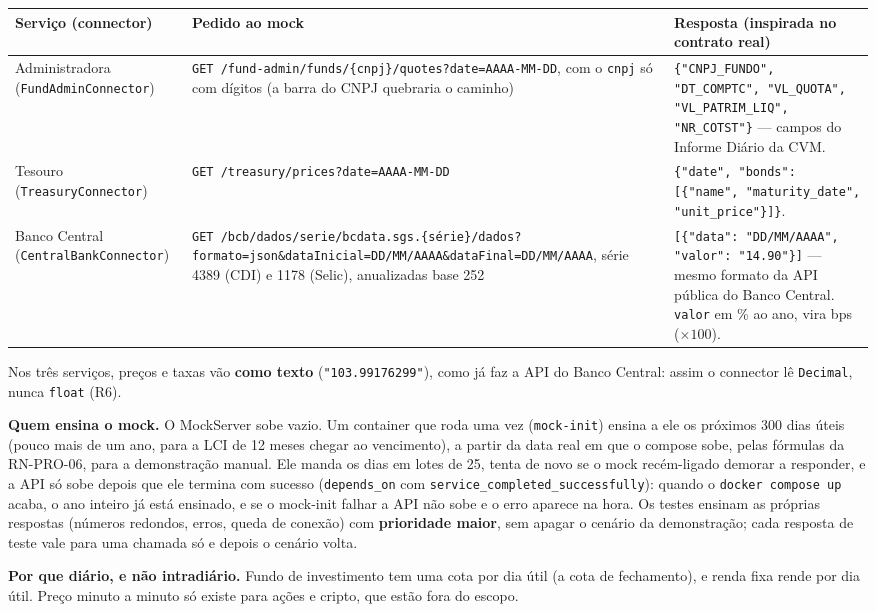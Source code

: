 \documentclass[11pt,a4paper]{article}
\newcommand{\tb}[1]{\texttt{#1}}           %
\begin{document}
\begingroup\small
\begin{longtable}{@{}P{2.7cm}P{6.3cm}P{7.0cm}@{}}
\toprule
\textbf{Serviço (connector)} & \textbf{Pedido ao mock} & \textbf{Resposta (inspirada no contrato real)} \\
\midrule
\endhead
Administradora (\tb{FundAdminConnector}) & \tb{GET /fund-admin/funds/\{cnpj\}/quotes?date=AAAA-MM-DD}, com o \tb{cnpj} só com dígitos (a barra do CNPJ quebraria o caminho) & \tb{\{"CNPJ_FUNDO", "DT_COMPTC", "VL_QUOTA", "VL_PATRIM_LIQ", "NR_COTST"\}} --- campos do Informe Diário da CVM. \\
Tesouro (\tb{TreasuryConnector}) & \tb{GET /treasury/prices?date=AAAA-MM-DD} & \tb{\{"date", "bonds": [\{"name", "maturity_date", "unit_price"\}]\}}. \\
Banco Central (\tb{CentralBankConnector}) & \tb{GET /bcb/dados/serie/bcdata.sgs.\{série\}/dados?formato=json\&dataInicial=DD/MM/AAAA\&dataFinal=DD/MM/AAAA}, série 4389 (CDI) e 1178 (Selic), anualizadas base 252 & \tb{[\{"data": "DD/MM/AAAA", "valor": "14.90"\}]} --- mesmo formato da API pública do Banco Central. \tb{valor} em \% ao ano, vira bps ($\times 100$). \\
\bottomrule
\end{longtable}
\endgroup

Nos três serviços, preços e taxas vão \textbf{como texto} (\tb{"103.99176299"}), como já faz a
API do Banco Central: assim o connector lê \tb{Decimal}, nunca \tb{float} (R6).

\textbf{Quem ensina o mock.} O MockServer sobe vazio. Um container que roda uma vez
(\tb{mock-init}) ensina a ele os próximos 300 dias úteis (pouco mais de um ano, para a LCI de 12
meses chegar ao vencimento), a partir da data real em que o compose sobe, pelas fórmulas da
RN-PRO-06, para a demonstração manual. Ele manda os dias em lotes de 25, tenta de novo se o mock
recém-ligado demorar a responder, e a API só sobe depois que ele termina com sucesso
(\tb{depends_on} com \tb{service_completed_successfully}): quando o \tb{docker compose up} acaba, o
ano inteiro já está ensinado, e se o mock-init falhar a API não sobe e o erro aparece na hora. Os testes ensinam as próprias
respostas (números redondos, erros, queda de conexão) com \textbf{prioridade maior}, sem apagar o
cenário da demonstração; cada resposta de teste vale para uma chamada só e depois o cenário volta.

\textbf{Por que diário, e não intradiário.} Fundo de investimento tem uma cota por dia útil (a
cota de fechamento), e renda fixa rende por dia útil. Preço minuto a minuto só existe para ações e
cripto, que estão fora do escopo.
\end{document}
